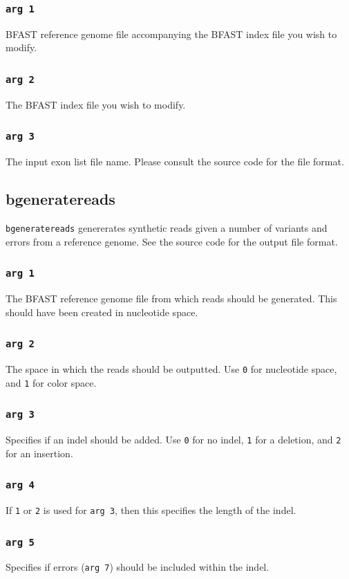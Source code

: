 \documentclass[a4paper,12pt]{book}
\newcommand{\TT}[1]{{\tt #1}} %
\newcommand{\BRGF}{BFAST reference genome file} %
\newcommand{\BIF}{BFAST index file} %
\begin{document}
\subsubsection{\TT{arg 1}}
\BRGF{} accompanying the \BIF{} you wish to modify.

\subsubsection{\TT{arg 2}}
The \BIF{} you wish to modify.

\subsubsection{\TT{arg 3}}
The input exon list file name. 
Please consult the source code for the file format.
\subsection{bgeneratereads}
\label{sec:bgeneratereads}
\TT{bgeneratereads} genererates synthetic reads given a number of variants and errors from a reference genome.
See the source code for the output file format.

\subsubsection{\TT{arg 1}}
The \BRGF{} from which reads should be generated.
This should have been created in nucleotide space.
\subsubsection{\TT{arg 2}}
The space in which the reads should be outputted.
Use \TT{0} for nucleotide space, and \TT{1} for color space.
\subsubsection{\TT{arg 3}}
Specifies if an indel should be added.
Use \TT{0} for no indel, \TT{1} for a deletion, and \TT{2} for an insertion.
\subsubsection{\TT{arg 4}}
If \TT{1} or \TT{2} is used for \TT{arg 3}, then this specifies the length of the indel.
\subsubsection{\TT{arg 5}}
Specifies if errors (\TT{arg 7}) should be included within the indel. 
\end{document}
